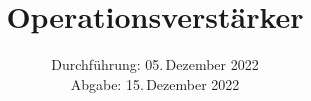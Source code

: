 

\subject{V51}
\title{Operationsverstärker}
\date{%
  Durchführung: 05.\,Dezember 2022
  \\
  Abgabe: 15.\,Dezember 2022
}



\maketitle
\thispagestyle{empty}
\tableofcontents
\newpage







\newpage
\printbibliography{}


